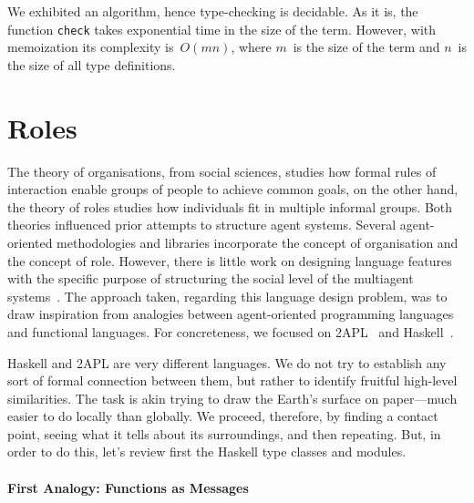 \documentclass[a4paper,12pt,oneside,fleqn]{book} %
\newcommand{\rg}[1]{\marginpar{\tiny\raggedright\textcolor{blue}{\bf rg:} #1}}
\renewcommand{\rg}{}
\begin{document}
We exhibited an algorithm, hence type-checking is decidable. As it is, the
function \verb|check| takes exponential time in the size of the term.
However, with memoization its complexity is~$O(mn)$, where $m$~is the
size of the term and $n$~is the size of all type definitions.

\section{Roles}\label{sec:roles} %
The theory of organisations, from social sciences, studies how formal rules
of interaction enable groups of people to achieve common goals, on the
other hand, the theory of roles studies how individuals fit in multiple
informal groups. Both theories influenced prior attempts to structure agent
systems. Several agent-oriented methodologies and libraries incorporate the
concept of organisation and the concept of role.  However, there is little
work on designing language features with the specific purpose of
structuring the social level of the multiagent
systems~\cite{collier2005,DBLP:journals/entcs/BaldoniBT06,DBLP:conf/oopsla/RicciS11}.
The approach taken, regarding this language design problem, was to draw
inspiration from analogies between agent-oriented programming languages and
functional languages. For concreteness, we focused on
2APL~\cite{DBLP:journals/aamas/Dastani08} and Haskell~\cite{web:haskell}.

Haskell and 2APL are very different languages. We do not try to establish
any sort of formal connection between them, but rather to identify fruitful
high-level similarities. The task is akin trying to draw the Earth's
surface on paper---much easier to do locally than globally. We proceed,
therefore, by finding a contact point, seeing what it tells about its
surroundings, and then repeating. But, in order to do this, let's review
first the Haskell type classes and modules.


\paragraph{First Analogy: Functions as Messages} %
\end{document}
